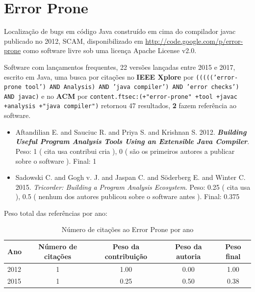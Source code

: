 \section{Error Prone}

Localização de bugs em código Java construído em cima do compilador javac
publicado no 2012, SCAM,
disponibilizado em \url{http://code.google.com/p/error-prone}
como software livre
sob uma licença Apache License v2.0.

Software com lançamentos frequentes,
22 versões lançadas
entre 2015 e 2017,
escrito em Java,
uma busca por citações no {\bf IEEE Xplore} por
\texttt{((((('error-prone tool') AND Analysis) AND 'java compiler') AND 'error checks') AND javac)}
e no {\bf ACM} por
\texttt{content.ftsec:(+"error-prone" +tool +javac +analysis +"java compiler")}
retornou
47 resultados,
{\bf 2} fazem referência ao software.

\begin{itemize}
\item Aftandilian E. and Sauciuc R. and Priya S. and Krishnan S.
      2012.
        \textbf{\textit{ Building Useful Program Analysis Tools Using an Extensible Java Compiler}}.
      Peso:
      1 (
          cita
          usa
          contribui
          cria
      ),
      0 (
são os primeiros autores a publicar sobre o software
      ).
      Final:
      1

\item Sadowski C. and Gogh v. J. and Jaspan C. and Söderberg E. and Winter C.
      2015.
        \textit{ Tricorder: Building a Program Analysis Ecosystem}.
      Peso:
      0.25 (
          cita
          usa
      ),
      0.5 (
nenhum dos autores publicou sobre o software antes
      ).
      Final:
      0.375

\end{itemize}

Peso total das referências por ano:

\begin{table}[h]
\caption{Número de citações ao Error Prone por ano}
\centering
\begin{tabular}{| l | c | c | c | c |}
  \hline
  Ano & Número de citações & Peso da contribuição & Peso da autoria & Peso final \\
  \hline
  2012
    & 1
    & 1.00
    & 0.00
    & 1.00 \\
  2015
    & 1
    & 0.25
    & 0.50
    & 0.38 \\
  \hline
\end{tabular}
\end{table}


